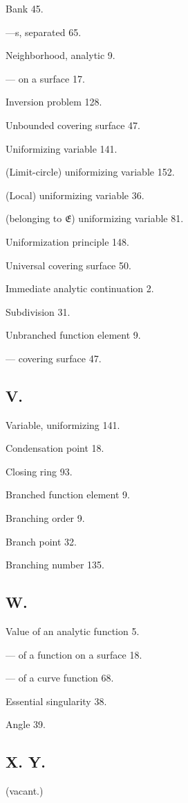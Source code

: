 \documentclass{article}
\begin{document}
Bank 45.

---s, separated 65.

Neighborhood, analytic 9.

--- on a surface 17.

Inversion problem 128.

Unbounded covering surface 47.

Uniformizing variable 141.

(Limit-circle) uniformizing variable 152.

(Local) uniformizing variable 36.

(belonging to $\mathfrak{E}$) uniformizing variable 81.

Uniformization principle 148.

Universal covering surface 50.

Immediate analytic continuation 2.

Subdivision 31.

Unbranched function element 9.

--- covering surface 47.

\subsection*{V.}

Variable, uniformizing 141.

Condensation point 18.

Closing ring 93.

Branched function element 9.

Branching order 9.

Branch point 32.

Branching number 135.

\subsection*{W.}

Value of an analytic function 5.

--- of a function on a surface 18.

--- of a curve function 68.

Essential singularity 38.

Angle 39.

\subsection*{X. Y.}

(vacant.)
\end{document}
